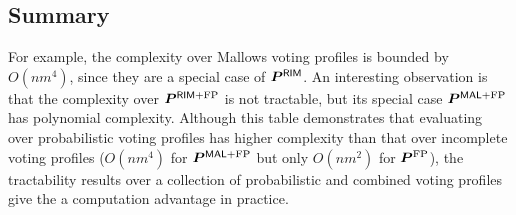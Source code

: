 \subsection{Summary}
\label{sec:algorithms:summary}

For example, the complexity over Mallows voting profiles is bounded by $O(nm^4)$, since they are a special case of $\bm{P}^{\mathsf{RIM}}$.
An interesting observation is that the \mew complexity over $\bm{P}^{\mathsf{RIM} \text{+FP}}$ is not tractable, but its special case $\bm{P}^{\mathsf{MAL} \text{+FP}}$ has polynomial complexity.
Although this table demonstrates that evaluating \mew over probabilistic voting profiles has higher complexity than that over incomplete voting profiles (\eg $O(nm^4)$ for $\bm{P}^{\mathsf{MAL} \text{+FP}}$ but only $O(nm^2)$ for $\bm{P}^{\text{FP}}$), the tractability results over a collection of probabilistic and combined voting profiles give the \mew a computation advantage in practice.
